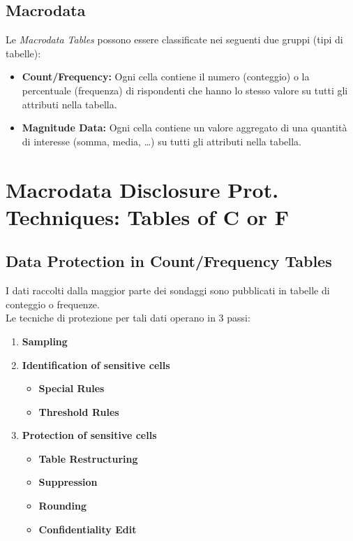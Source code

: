 \documentclass{report}
\begin{document}
\subsection{Macrodata}
Le \textit{Macrodata Tables} possono essere classificate nei seguenti due gruppi (tipi di tabelle):
\begin{itemize}
    \item \textbf{Count/Frequency:} Ogni cella contiene il numero (conteggio) o la percentuale (frequenza) di rispondenti che hanno lo stesso valore su tutti gli attributi nella tabella.
    \item \textbf{Magnitude Data:} Ogni cella contiene un valore aggregato di una quantità di interesse (somma, media, \dots) su tutti gli attributi nella tabella.
\end{itemize}

\section{Macrodata Disclosure Prot. Techniques: Tables of C or F}

\subsection{Data Protection in Count/Frequency Tables}
I dati raccolti dalla maggior parte dei sondaggi sono pubblicati in tabelle di conteggio o frequenze.\\ 
Le tecniche di protezione per tali dati operano in 3 passi:
\begin{enumerate}
    \item \textbf{Sampling}
    \item \textbf{Identification of sensitive cells}
    \begin{itemize}
        \item \textbf{Special Rules}
        \item \textbf{Threshold Rules}
    \end{itemize}
    \item \textbf{Protection of sensitive cells}
    \begin{itemize}
        \item \textbf{Table Restructuring}
        \item \textbf{Suppression}
        \item \textbf{Rounding}
        \item \textbf{Confidentiality Edit}
    \end{itemize}
\end{enumerate}
\end{document}
